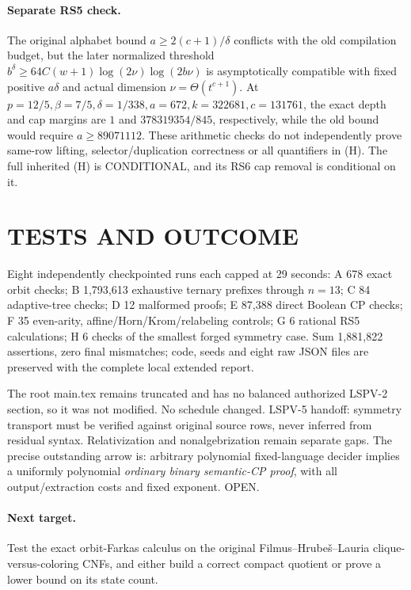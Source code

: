 \documentclass{article}
\begin{document}
\paragraph{Separate RS5 check.}
The original alphabet bound $a\ge2(c+1)/\delta$ conflicts with the old compilation budget, but the later normalized threshold $b^\delta\ge64C(w+1)\log(2\nu)\log(2b\nu)$ is asymptotically compatible with fixed positive $a\delta$ and actual dimension $\nu=\Theta(t^{c+1})$. At $p=12/5,\beta=7/5,\delta=1/338,a=672,k=322681,c=131761$, the exact depth and cap margins are $1$ and $378319354/845$, respectively, while the old bound would require $a\ge89071112$. These arithmetic checks do not independently prove same-row lifting, selector/duplication correctness or all quantifiers in (H). The full inherited (H) is CONDITIONAL, and its RS6 cap removal is conditional on it.

\section{TESTS AND OUTCOME}
Eight independently checkpointed runs each capped at 29 seconds: A 678 exact orbit checks; B 1,793,613 exhaustive ternary prefixes through $n=13$; C 84 adaptive-tree checks; D 12 malformed proofs; E 87,388 direct Boolean CP checks; F 35 even-arity, affine/Horn/Krom/relabeling controls; G 6 rational RS5 calculations; H 6 checks of the smallest forged symmetry case. Sum 1,881,822 assertions, zero final mismatches; code, seeds and eight raw JSON files are preserved with the complete local extended report.

The root main.tex remains truncated and has no balanced authorized LSPV-2 section, so it was not modified. No schedule changed. LSPV-5 handoff: symmetry transport must be verified against original source rows, never inferred from residual syntax. Relativization and nonalgebrization remain separate gaps. The precise outstanding arrow is: arbitrary polynomial fixed-language decider implies a uniformly polynomial \emph{ordinary binary semantic-CP proof}, with all output/extraction costs and fixed exponent. OPEN.
\paragraph{Next target.} Test the exact orbit-Farkas calculus on the original Filmus--Hrube\v{s}--Lauria clique-versus-coloring CNFs, and either build a correct compact quotient or prove a lower bound on its state count.
\end{document}
